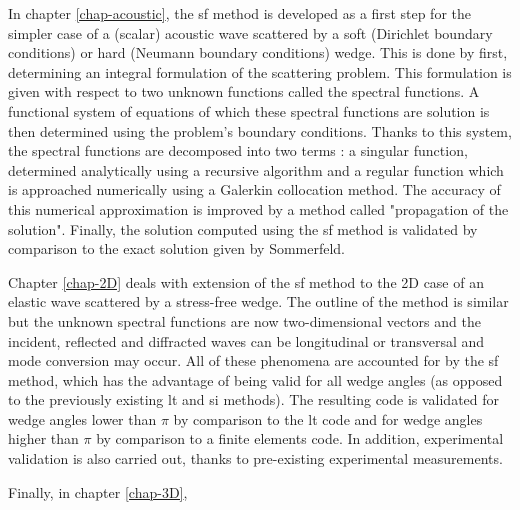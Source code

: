 In chapter \ref{chap-acoustic}, the \acrfull{sf} method is developed as a first step for the simpler case of a (scalar) acoustic wave scattered by a soft (Dirichlet boundary conditions) or hard (Neumann boundary conditions) wedge. This is done by first, determining an integral formulation of the scattering problem. This formulation is given with respect to two unknown functions called the spectral functions. A functional system of equations of which these spectral functions are solution is then determined using the problem's boundary conditions. Thanks to this system, the spectral functions are decomposed into two terms : a singular function, determined analytically using a recursive algorithm and a regular function which is approached numerically using a Galerkin collocation method. The accuracy of this numerical approximation is improved by a method called "propagation of the solution". Finally, the solution computed using the \acrlong{sf} method is validated by comparison to the exact solution given by Sommerfeld.

Chapter \ref{chap-2D} deals with extension of the \acrlong{sf} method to the 2D case of an elastic wave scattered by a stress-free wedge. The outline of the method is similar but the unknown spectral functions are now two-dimensional vectors and the incident, reflected and diffracted waves can be longitudinal or transversal and mode conversion may occur. All of these phenomena are accounted for by the \acrlong{sf} method, which has the advantage of being valid for all wedge angles (as opposed to the previously existing \acrfull{lt} and \acrlong{si} methods). The resulting code is validated for wedge angles lower than $\pi$ by comparison to the \acrshort{lt} code and for wedge angles higher than $\pi$ by comparison to a finite elements code. In addition, experimental validation is also carried out, thanks to pre-existing experimental measurements.

Finally, in chapter \ref{chap-3D},